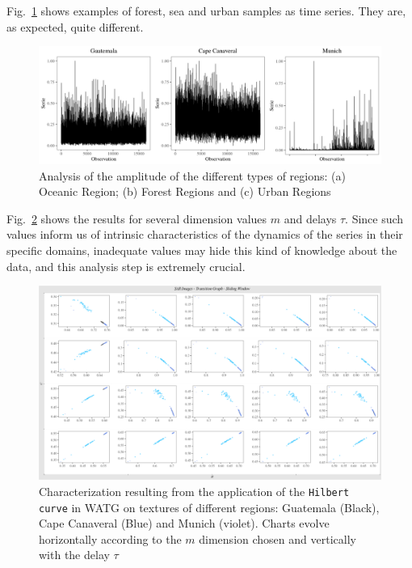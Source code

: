 \documentclass{isprs}
\begin{document}

Fig.~\ref{fig:AmplitudeSAR} shows examples of forest, sea and urban samples as time series.
They are, as expected, quite different.

\begin{figure}[hbt]
	\includegraphics[width=\columnwidth]{Figures/SAR_signal.pdf}
	\caption{Analysis of the amplitude of the different types of regions: (a) Oceanic Region; (b) Forest Regions and (c) Urban Regions}
	\label{fig:AmplitudeSAR}
\end{figure}


Fig.~\ref{fig:Regions} shows the results for several dimension values $m$ and delays $\tau$.
Since such values inform us of intrinsic characteristics of the dynamics of the series in their specific domains, inadequate values may hide this kind of knowledge about the data, and this analysis step is extremely crucial.

\begin{figure}
	\centering
	\includegraphics[width=1.05\textwidth]{Figures/transitionGraphHilbert.pdf}
	\caption{Characterization resulting from the application of the \texttt{Hilbert curve} in WATG on textures of different regions: Guatemala (Black), Cape Canaveral (Blue) and Munich (violet). Charts evolve horizontally according to the $m$ dimension chosen and vertically with the delay $\tau$}
	\label{fig:Regions}
\end{figure}
\end{document}
